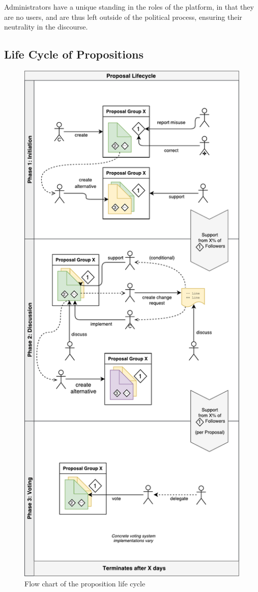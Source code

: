 Administrators have a unique standing in the roles of the platform, in that they are no users, and are thus left outside of the political process, ensuring their neutrality in the discourse.

\subsection{Life Cycle of Propositions}
\label{sec:Model_Propositions}

\begin{figure}[H]
\centering
\includegraphics[height=0.6\paperheight]{img/lifecycle_flow_v0.pdf}
\caption{Flow chart of the proposition life cycle}
\label{fig:proplife}
\end{figure}

